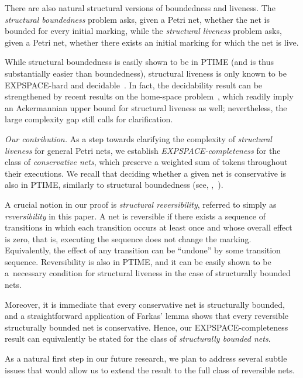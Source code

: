 There are also natural structural versions of boundedness and liveness.
The \emph{structural boundedness} problem asks, given a Petri net, whether the net is bounded for every initial marking, while the \emph{structural liveness} problem asks, given a Petri net, whether there exists an initial marking for which the net is live.

While structural boundedness is easily shown to be in PTIME (and is thus substantially easier than boundedness), structural liveness is only known to be EXPSPACE-hard and decidable~\cite{DBLP:journals/acta/JancarP19}. In fact, the decidability result can be strengthened by recent results on the home-space problem~\cite{DBLP:conf/concur/JancarL23,DBLP:journals/lmcs/JancarL24}, which readily imply an Ackermannian upper bound for structural liveness as well; nevertheless, the large complexity gap still calls for clarification.


\emph{Our contribution.}
As a step towards clarifying the complexity of \emph{structural
liveness} for general Petri nets, we establish
\emph{EXPSPACE-completeness} for the class of \emph{conservative
nets}, which preserve a weighted sum of tokens throughout their
executions. We recall that deciding whether a given net is
conservative is also in PTIME, similarly to structural boundedness
(see, \eg,~\cite{DBLP:conf/apn/MayrW14}).

A crucial notion in our proof is \emph{structural reversibility},
referred to simply as \emph{reversibility} in this paper. 
A net is reversible if there exists a sequence of transitions in which
each transition occurs at least once and whose overall effect is zero,
that is, executing the sequence does not change the marking.
Equivalently, the effect of any transition can be ``undone'' by some transition sequence.
Reversibility is also in PTIME, and it can be easily shown to be a~necessary condition for structural liveness in the case of structurally bounded nets.

Moreover, it is immediate that every conservative net is structurally bounded, and a straightforward application of Farkas’ lemma shows that every reversible structurally bounded net is conservative. Hence, our EXPSPACE-completeness result can equivalently be stated for the class of \emph{structurally bounded nets}.

As a natural first step in our future research, we plan to address several subtle issues that would allow us to extend the result to the full class of reversible nets.

